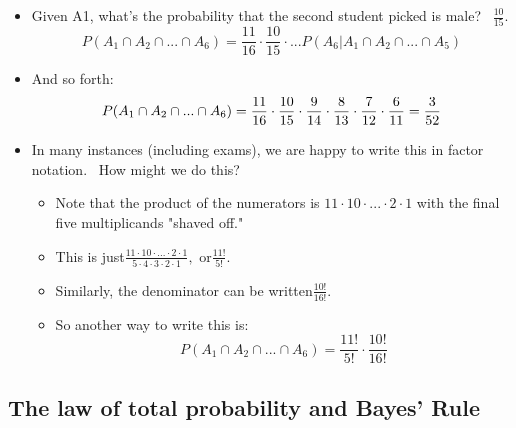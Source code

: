 \documentclass[11pt]{article}
\begin{document}
\begin{itemize}
\begin{itemize}
\item Given A1, what's the probability that the second student picked is
male? \ $\frac{10}{15}.$%
\begin{equation*}
P(A_{1}\cap A_{2}\cap ...\cap A_{6})=\frac{11}{16}\cdot \frac{10}{15}\cdot
...P(A_{6}|A_{1}\cap A_{2}\cap ...\cap A_{5})
\end{equation*}

\item And so forth: 
\begin{equation*}
P(A_{1}\cap A_{2}\cap ...\cap A_{6})=\frac{11}{16}\cdot \frac{10}{15}\cdot 
\frac{9}{14}\cdot \frac{8}{13}\cdot \frac{7}{12}\cdot \frac{6}{11}=\frac{3}{%
52}
\end{equation*}

\item In many instances (including exams), we are happy to write this in
factor notation. \ How might we do this? \ 

\begin{itemize}
\item Note that the product of the numerators is $11\cdot 10\cdot ...\cdot
2\cdot 1$ with the final five multiplicands "shaved off." $\ $

\item This is just$\frac{11\cdot 10\cdot ...\cdot 2\cdot 1}{5\cdot 4\cdot
3\cdot 2\cdot 1},$ or$\frac{11!}{5!}.$

\item Similarly, the denominator can be written$\frac{10!}{16!}.$

\item So another way to write this is:%
\begin{equation*}
P(A_{1}\cap A_{2}\cap ...\cap A_{6})=\frac{11!}{5!}\cdot \frac{10!}{16!}
\end{equation*}
\end{itemize}
\end{itemize}
\end{itemize}

\subsection{The law of total probability and Bayes' Rule}
\end{document}
